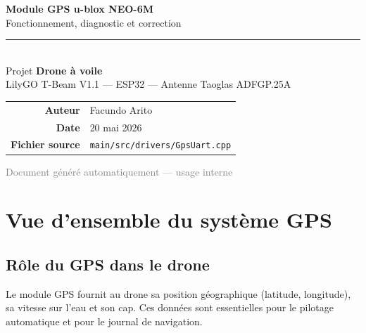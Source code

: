 \documentclass[12pt,a4paper]{article}
\newcommand{\code}[1]{\texttt{#1}}
\begin{document}

\begin{titlepage}
  \centering
  \vspace*{2cm}

  {\Huge\bfseries\color{frameaccent} Module GPS u-blox NEO-6M}\\[0.6em]
  {\Large Fonctionnement, diagnostic et correction}\\[2em]

  \textcolor{gray}{\rule{0.6\textwidth}{0.5pt}}\\[1.5em]

  {\large Projet \textbf{Drone \`a voile}\\[0.4em]
  LilyGO T-Beam V1.1 --- ESP32 --- Antenne Taoglas ADFGP.25A}\\[3em]

  \begin{tabular}{rl}
    \textbf{Auteur}         & Facundo Arito \\[0.3em]
    \textbf{Date}           & 20 mai 2026 \\[0.3em]
    \textbf{Fichier source} & \code{main/src/drivers/GpsUart.cpp} \\
  \end{tabular}

  \vfill
  \textcolor{gray}{\small Document g\'en\'er\'e automatiquement --- usage interne}
\end{titlepage}

\tableofcontents
\newpage

\section{Vue d'ensemble du syst\`eme GPS}

\subsection{R\^ole du GPS dans le drone}

Le module GPS fournit au drone sa position g\'eographique (latitude, longitude),
sa vitesse sur l'eau et son cap. Ces donn\'ees sont essentielles pour le pilotage
automatique et pour le journal de navigation.
\end{document}
